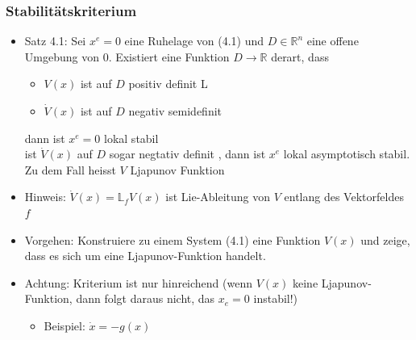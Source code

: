 \documentclass[11pt,a4paper]{article}
\begin{document}
\subsubsection{Stabilitätskriterium}
\begin{itemize}
\item Satz 4.1: Sei $x^e = 0$ eine Ruhelage von (4.1) und $D \in \mathbb{R}^n $ eine offene Umgebung von $0$. Existiert eine Funktion $D\rightarrow \mathbb{R}$ derart, dass

\begin{itemize}
\item $V(x)$ ist auf $D$ positiv definit L
\item $\dot V(x)$ ist auf $D$ negativ semidefinit
\end{itemize} 

dann ist $x^e = 0$ lokal stabil \\
ist $\dot V(x)$ auf $D$ sogar negtativ definit , dann ist $x^e$ lokal asymptotisch stabil. \\
Zu dem Fall heisst $V$ Ljapunov Funktion
\item Hinweis: $\dot V(x) = \mathbb{L}_fV(x) $ ist Lie-Ableitung von $V$ entlang des Vektorfeldes $f$
\item Vorgehen: Konstruiere zu einem System (4.1) eine Funktion $V(x)$ und zeige, dass es sich um eine Ljapunov-Funktion handelt.
\item Achtung: Kriterium ist nur hinreichend (wenn $V(x)$ keine Ljapunov-Funktion, dann folgt daraus nicht, das $x_e = 0$ instabil!)
\begin{itemize}
\item Beispiel: $\dot x = - g(x) $
\end{itemize}
\end{itemize}
\end{document}
